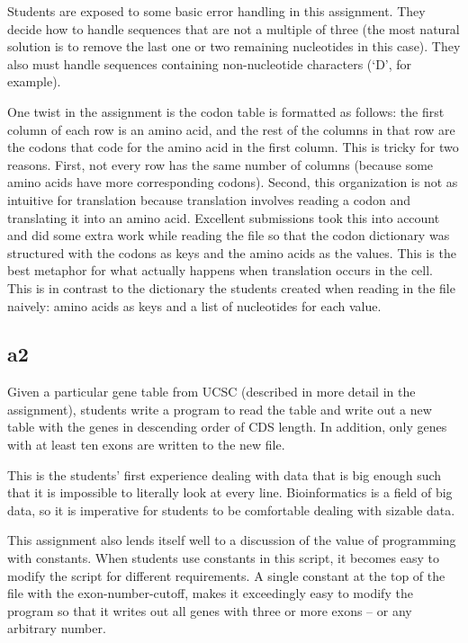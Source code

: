 \documentclass{report}
\begin{document}
Students are exposed to some basic error handling in this assignment. They decide how to handle sequences that are not a multiple of three (the most natural solution is to remove the last one or two remaining nucleotides in this case). They also must handle sequences containing non-nucleotide characters (`D', for example).

One twist in the assignment is the codon table is formatted as follows: the first column of each row is an amino acid, and the rest of the columns in that row are the codons that code for the amino acid in the first column. This is tricky for two reasons. First, not every row has the same number of columns (because some amino acids have more corresponding codons). Second, this organization is not as intuitive for translation because translation involves reading a codon and translating it into an amino acid. Excellent submissions took this into account and did some extra work while reading the file so that the codon dictionary was structured with the codons as keys and the amino acids as the values. This is the best metaphor for what actually happens when translation occurs in the cell. This is in contrast to the dictionary the students created when reading in the file naively: amino acids as keys and a list of nucleotides for each value.

\subsection{a2}
Given a particular gene table from UCSC \cite{karolchik2003ucsc} (described in more detail in the assignment), students write a program to read the table and write out a new table with the genes in descending order of CDS length. In addition, only genes with at least ten exons are written to the new file. 

This is the students' first experience dealing with data that is big enough such that it is impossible to literally look at every line. Bioinformatics is a field of big data, so it is imperative for students to be comfortable dealing with sizable data.

This assignment also lends itself well to a discussion of the value of programming with constants. When students use constants in this script, it becomes easy to modify the script for different requirements. A single constant at the top of the file with the exon-number-cutoff, makes it exceedingly easy to modify the program so that it writes out all genes with three or more exons -- or any arbitrary number.
\end{document}
